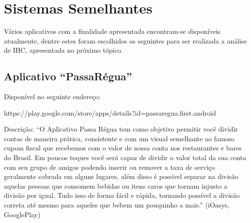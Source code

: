 \chapter{Sistemas Semelhantes}\label{cap2}

Vários aplicativos com a finalidade apresentada encontram-se disponíveis atualmente, dentre estes foram escolhidos os seguintes para ser realizada a análise de IHC, apresentada no próximo tópico.

\section{Aplicativo ``PassaRégua''}

Disponível no seguinte endereço:

https://play.google.com/store/apps/details?id=passaregua.first.android

Descrição: “O Aplicativo Passa Régua tem como objetivo permitir você dividir contas de maneira prática, consistente e com um visual semelhante ao famoso cupom fiscal que recebemos com o valor de nossa conta nos restaurantes e bares do Brasil.
Em poucos toques você será capaz de dividir o valor total da sua conta com seu grupo de amigos podendo inserir ou remover a taxa de serviço geralmente cobrada em alguns lugares, além disso é possível separar na divisão aquelas pessoas que consomem bebidas ou itens caros que tornam injusto a divisão por igual. Tudo isso de forma fácil e rápida, tornando possível a divisão correta até mesmo para aqueles que bebem um pouquinho a mais.” (iOasys, GooglePlay)